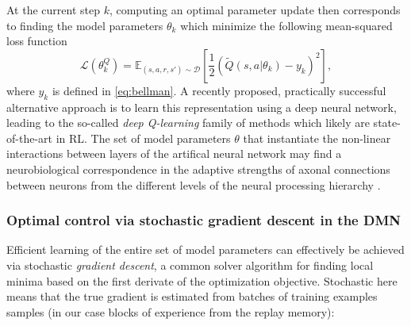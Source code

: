 \documentclass[10pt,letterpaper]{article}
\begin{document}
At the current step $k$, computing an optimal parameter update then corresponds to
finding the model parameters $\theta_{k}$ which minimize the following mean-squared loss function
\begin{equation}
  \mathcal L(\theta^Q_{k})
  = \mathbb E_{(s, a, r, s') \sim \mathcal D}\left[\frac{1}{2}(\tilde{Q}(s, a|\theta_{k}) - y_k)^2\right],
  \label{eq:oracle}
\end{equation}
where $y_k$ is defined in \eqref{eq:bellman}.
A recently proposed, practically successful alternative approach
\citep{mnih2015,silver2016mastering} is to learn this
representation using a deep neural network, leading to the
so-called \textit{deep Q-learning} family of methods which
likely are state-of-the-art in RL.
The set of model parameters $\theta$ that instantiate the non-linear interactions
between layers of the artifical neural network
may find a neurobiological correspondence in the adaptive strengths of axonal
connections between neurons from the different levels
of the neural processing hierarchy
\citep{mesulam1998sensation, taylor2015global}.


\subsubsection{Optimal control via stochastic gradient descent in the DMN}
Efficient learning of the entire set of model parameters can effectively be achieved
via stochastic \textit{gradient descent}, a common solver algorithm for finding
local minima based on the first derivate of the optimization objective.
Stochastic here means that the true gradient is estimated from batches of training examples samples (in our case blocks of experience from the replay memory):

\end{document}

